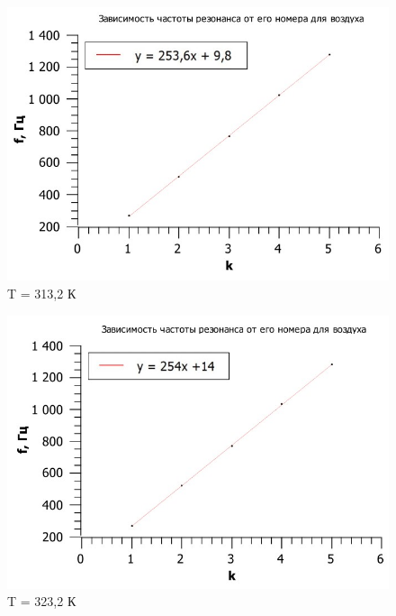 \documentclass[12pt,a4paper]{article}
\begin{document}
\begin{figure}[h!]
\centering
\includegraphics[scale=0.4]{V_7-1.jpg}
\caption{T = 313,2 К}
\label{fig:Experimental setup}
\end{figure}


\begin{figure}[h!]
\centering
\includegraphics[scale=0.4]{V_8-1.jpg}
\caption{T = 323,2 К}
\label{fig:Experimental setup}
\end{figure}
\end{document}

